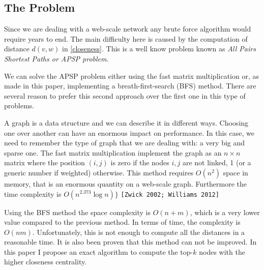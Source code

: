 \clearpage
\subsection{The Problem}

Since we are dealing with a web-scale network any brute force algorithm would require years to end. The main difficulty here is caused by the computation of distance $d(v,w)$ in \eqref{closeness}. This is a well know problem known as \emph{All Pairs Shortest Paths or APSP problem}. \s

\noindent We can solve the APSP problem either using the fast matrix multiplication or, as made in this paper, implementing a breath-first-search (BFS) method. There are several reason to prefer this second approach over the first one in this type of problems. \s

\noindent A graph is a data structure and we can describe it in different ways. Choosing one over another can have an enormous impact on performance. In this case, we need to remember the type of graph that we are dealing with: a very big and sparse one. The fast matrix multiplication implement the graph as an $n\times n$ matrix where the position $(i,j)$ is zero if the nodes $i,j$ are not linked, 1 (or a generic number if weighted) otherwise. This method requires $O(n^2)$ space in memory, that is an enormous quantity on a web-scale graph. Furthermore the time complexity is $O(n^{2.373} \log n)\}$ \texttt{[Zwick 2002; Williams 2012]}  \s

\noindent Using the BFS method the space complexity is $O(n+m)$, which is a very lower value compared to the previous method. In terms of time, the complexity is $O(nm)$. Unfortunately, this is not enough to compute all the distances in a reasonable time. It is also been proven that this method can not be improved. In this paper I propose an exact algorithm to compute the top-$k$ nodes with the higher closeness centrality.
